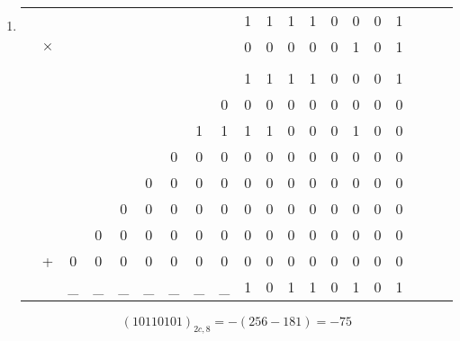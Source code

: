 \documentclass{article}
\begin{document}
\begin{enumerate}
\begin{enumerate}
\begin{enumerate}
			            \item
			                  \begin{tabular}{cccccccccccccccccccc}
				                         &          &    &    &    &    &    &    &    & 1 & 1 & 1 & 1 & 0 & 0 & 0 & 1 \\
				                         & $\times$ &    &    &    &    &    &    &    & 0 & 0 & 0 & 0 & 0 & 1 & 0 & 1 \\
				                  \hline &          &    &    &    &    &                                              \\
				                         &          &    &    &    &    &    &    &    & 1 & 1 & 1 & 1 & 0 & 0 & 0 & 1 \\
				                         &          &    &    &    &    &    &    & 0  & 0 & 0 & 0 & 0 & 0 & 0 & 0 & 0 \\
				                         &          &    &    &    &    &    & 1  & 1  & 1 & 1 & 0 & 0 & 0 & 1 & 0 & 0 \\
				                         &          &    &    &    &    & 0  & 0  & 0  & 0 & 0 & 0 & 0 & 0 & 0 & 0 & 0 \\
				                         &          &    &    &    & 0  & 0  & 0  & 0  & 0 & 0 & 0 & 0 & 0 & 0 & 0 & 0 \\
				                         &          &    &    & 0  & 0  & 0  & 0  & 0  & 0 & 0 & 0 & 0 & 0 & 0 & 0 & 0 \\
				                         &          &    & 0  & 0  & 0  & 0  & 0  & 0  & 0 & 0 & 0 & 0 & 0 & 0 & 0 & 0 \\
				                         & +        & 0  & 0  & 0  & 0  & 0  & 0  & 0  & 0 & 0 & 0 & 0 & 0 & 0 & 0 & 0 \\
				                  \hline
				                         &          & \_ & \_ & \_ & \_ & \_ & \_ & \_ & 1 & 0 & 1 & 1 & 0 & 1 & 0 & 1 \\
			                  \end{tabular}
			                  $$
				                  (10110101)_{2c,8} = -(256 - 181) = \boxed{ -75 }
			                  $$
		            \end{enumerate}

	      \end{enumerate}


\end{enumerate}
\end{document}
